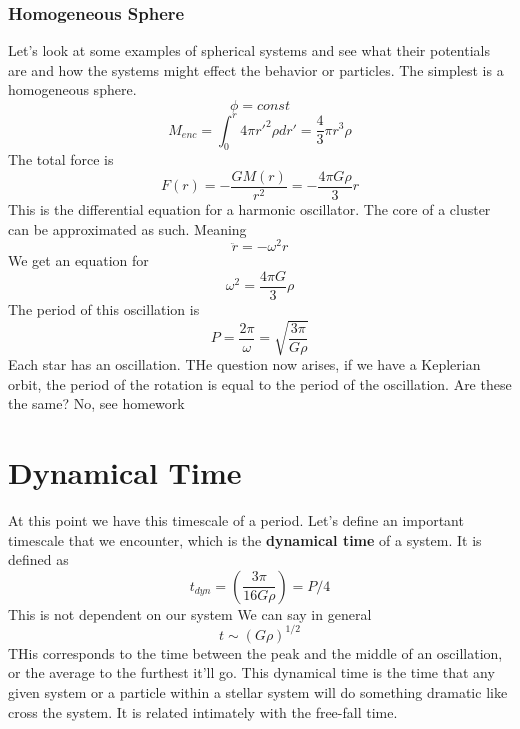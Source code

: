\subsubsection{Homogeneous Sphere}
Let's look at some examples of spherical systems and see what their
potentials are and how the systems might effect the behavior or
particles. The simplest is a homogeneous sphere. 
\begin{equation}
\phi = const
\end{equation}
\begin{equation}
M_{enc} = \int_0^r 4\pi r'^2 \rho dr' = \frac{4}{3} \pi r^3 \rho
\end{equation}
The total force is 
\begin{equation}
F(r) = - \frac{GM(r)}{r^2} = - \frac{4\pi G\rho}{3} r
\end{equation}
This is the differential equation for a harmonic oscillator. The core
of a cluster can be approximated as such. Meaning
\begin{equation}
\ddot{r} = -\omega^2r
\end{equation}
We get an equation for
\begin{equation}
\omega^2 = \frac{4\pi G}{3} \rho
\end{equation}
The period of this oscillation is
\begin{equation}
P = \frac{2\pi}{\omega}  = \sqrt{\frac{3\pi}{G\rho}}
\end{equation}
Each star has an oscillation. THe question now arises, if we have a
Keplerian orbit, the period of the rotation is equal to the period of
the oscillation. Are these the same? No, see homework

\section{Dynamical Time}
At this point we have this timescale of a period. Let's define an
important timescale that we encounter, which is the \textbf{dynamical time} of
a system. It is defined as 
\begin{equation}
t_{dyn} = (\frac{3\pi}{16 G\rho}) = P/4
\end{equation}
This is not dependent on our system
We can say in general
\begin{equation}
t \sim (G\rho)^{1/2} 
\end{equation}
THis corresponds to the time between the peak and the middle of an
oscillation, or the average to the furthest it'll go. This dynamical
time is the time that any given system or a particle within a stellar
system will do something dramatic like cross the system. It is related
intimately with the free-fall time. 


